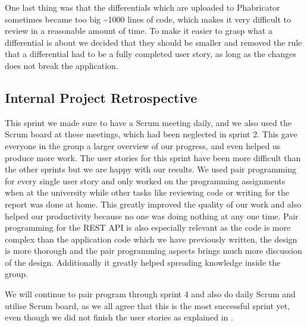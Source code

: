 One last thing was that the differentials which are uploaded to Phabricator sometimes became too big \textasciitilde 1000 lines of code, which makes it very difficult to review in a reasonable amount of time.
To make it easier to grasp what a differential is about we decided that they should be smaller and removed the rule that a differential had to be a fully completed user story, as long as the changes does not break the application.

\subsection*{Internal Project Retrospective}
This sprint we made sure to have a Scrum meeting daily, and we also used the Scrum board at these meetings, which had been neglected in sprint 2.
This gave everyone in the group a larger overview of our progress, and even helped us produce more work. 
The user stories for this sprint have been more difficult than the other sprints but we are happy with our results.
We used pair programming for every single user story and only worked on the programming assignments when at the university while other tasks like reviewing code or writing for the report was done at home.
This greatly improved the quality of our work and also helped our productivity because no one was doing nothing at any one time.
Pair programming for the REST API is also especially relevant as the code is more complex than the application code which we have previously written, the design is more thorough and the pair programming aspects brings much more discussion of the design.
Additionally it greatly helped spreading knowledge inside the group.

We will continue to pair program through sprint 4 and also do daily Scrum and utilise Scrum board, as we all agree that this is the most successful sprint yet, even though we did not finish the user stories as explained in .
